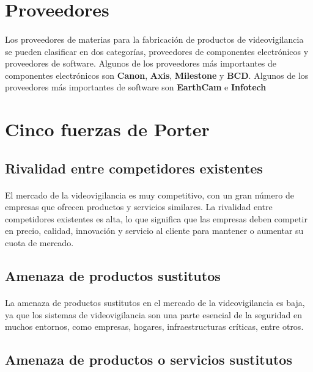 \documentclass{report}
\begin{document}
      \section{Proveedores}
        \paragraph*{}
        {
          Los proveedores de materias para la fabricación de productos de videovigilancia se pueden clasificar en dos categorías, proveedores de componentes electrónicos y proveedores de software. 
          Algunos de los proveedores más importantes de componentes electrónicos son \textbf{Canon}, \textbf{Axis}, \textbf{Milestone} y \textbf{BCD}. 
          Algunos de los proveedores más importantes de software son \textbf{EarthCam} e \textbf{Infotech}
        }
      \section{Cinco fuerzas de Porter}
        \subsection*{Rivalidad entre competidores existentes}
          \paragraph*{}{El mercado de la videovigilancia es muy competitivo, con un gran número de empresas que ofrecen productos y servicios similares. La rivalidad entre competidores existentes es alta, lo que significa que las empresas deben competir en precio, calidad, innovación y servicio al cliente para mantener o aumentar su cuota de mercado.}
        \subsection*{Amenaza de productos sustitutos}
          \paragraph*{}{La amenaza de productos sustitutos en el mercado de la videovigilancia es baja, ya que los sistemas de videovigilancia son una parte esencial de la seguridad en muchos entornos, como empresas, hogares, infraestructuras críticas, entre otros.}
        \subsection*{Amenaza de productos o servicios sustitutos}
\end{document}
